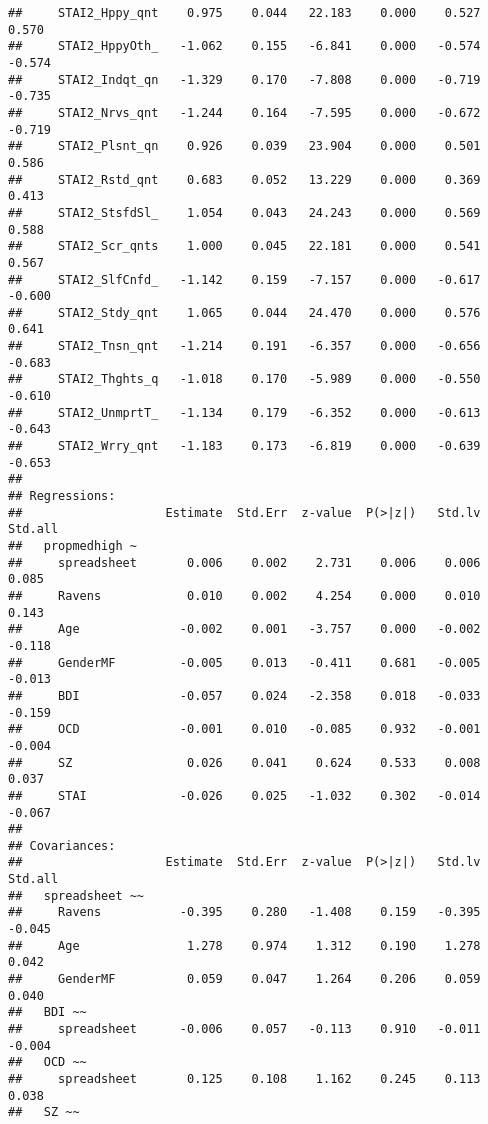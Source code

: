 \documentclass[]{article}
\begin{document}
\begin{verbatim}
##     STAI2_Hppy_qnt    0.975    0.044   22.183    0.000    0.527    0.570
##     STAI2_HppyOth_   -1.062    0.155   -6.841    0.000   -0.574   -0.574
##     STAI2_Indqt_qn   -1.329    0.170   -7.808    0.000   -0.719   -0.735
##     STAI2_Nrvs_qnt   -1.244    0.164   -7.595    0.000   -0.672   -0.719
##     STAI2_Plsnt_qn    0.926    0.039   23.904    0.000    0.501    0.586
##     STAI2_Rstd_qnt    0.683    0.052   13.229    0.000    0.369    0.413
##     STAI2_StsfdSl_    1.054    0.043   24.243    0.000    0.569    0.588
##     STAI2_Scr_qnts    1.000    0.045   22.181    0.000    0.541    0.567
##     STAI2_SlfCnfd_   -1.142    0.159   -7.157    0.000   -0.617   -0.600
##     STAI2_Stdy_qnt    1.065    0.044   24.470    0.000    0.576    0.641
##     STAI2_Tnsn_qnt   -1.214    0.191   -6.357    0.000   -0.656   -0.683
##     STAI2_Thghts_q   -1.018    0.170   -5.989    0.000   -0.550   -0.610
##     STAI2_UnmprtT_   -1.134    0.179   -6.352    0.000   -0.613   -0.643
##     STAI2_Wrry_qnt   -1.183    0.173   -6.819    0.000   -0.639   -0.653
## 
## Regressions:
##                    Estimate  Std.Err  z-value  P(>|z|)   Std.lv  Std.all
##   propmedhigh ~                                                         
##     spreadsheet       0.006    0.002    2.731    0.006    0.006    0.085
##     Ravens            0.010    0.002    4.254    0.000    0.010    0.143
##     Age              -0.002    0.001   -3.757    0.000   -0.002   -0.118
##     GenderMF         -0.005    0.013   -0.411    0.681   -0.005   -0.013
##     BDI              -0.057    0.024   -2.358    0.018   -0.033   -0.159
##     OCD              -0.001    0.010   -0.085    0.932   -0.001   -0.004
##     SZ                0.026    0.041    0.624    0.533    0.008    0.037
##     STAI             -0.026    0.025   -1.032    0.302   -0.014   -0.067
## 
## Covariances:
##                    Estimate  Std.Err  z-value  P(>|z|)   Std.lv  Std.all
##   spreadsheet ~~                                                        
##     Ravens           -0.395    0.280   -1.408    0.159   -0.395   -0.045
##     Age               1.278    0.974    1.312    0.190    1.278    0.042
##     GenderMF          0.059    0.047    1.264    0.206    0.059    0.040
##   BDI ~~                                                                
##     spreadsheet      -0.006    0.057   -0.113    0.910   -0.011   -0.004
##   OCD ~~                                                                
##     spreadsheet       0.125    0.108    1.162    0.245    0.113    0.038
##   SZ ~~                                                                 

\end{verbatim}
\end{document}
